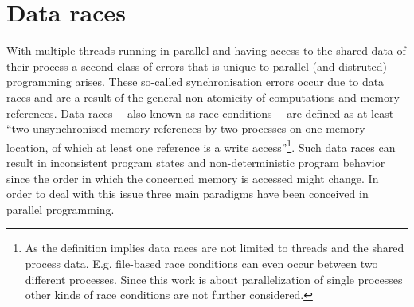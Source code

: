 \section{Data races}
With multiple threads running in parallel and having access to the shared data of their process a second class of errors that is unique to parallel (and distruted) programming arises. These so-called synchronisation errors occur due to data races and are a result of the general non-atomicity of computations and memory references. Data races--- also known as race conditions--- are defined as at least ``two unsynchronised memory references by two processes on one memory location, of which at least one reference is a write access''\cite[p.~327]{ParallelComputing}\footnote{As the definition implies data races are not limited to threads and the shared process data. E.g. file-based race conditions can even occur between two different processes\cite{OfficialISC2Guide}. Since this work is about parallelization of single processes other kinds of race conditions are not further considered.}. Such data races can result in inconsistent program states and non-deterministic program behavior since the order in which the concerned memory is accessed might change. In order to deal with this issue three main paradigms have been conceived in parallel programming.

